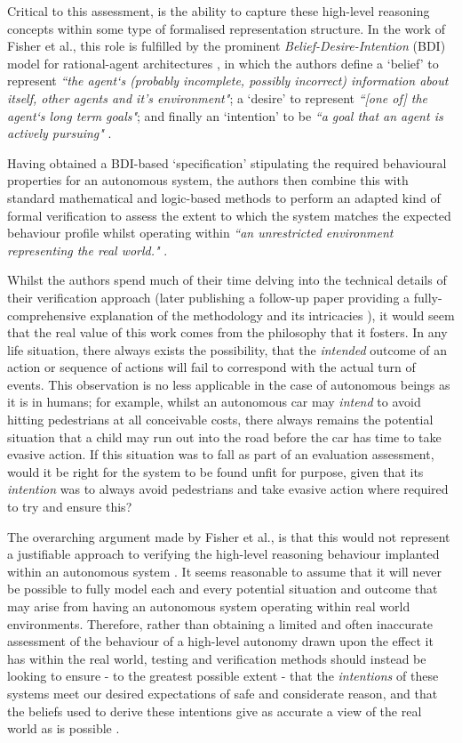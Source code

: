 \documentclass[conference]{IEEEtran}
\begin{document}
Critical to this assessment, is the ability to capture these high-level reasoning concepts within some type of formalised representation structure. In the work of Fisher et al., this role is fulfilled by the prominent \textit{Belief-Desire-Intention} (BDI) model for rational-agent architectures \cite{bdi}, in which the authors define a `belief' to represent \textit{``the agent`s (probably incomplete, possibly incorrect) information about itself, other agents and it's environment"}; a `desire' to represent \textit{``[one of] the agent`s long term goals"}; and finally an `intention' to be \textit{``a goal that an agent is actively pursuing"} \cite{fisher-1}. 

Having obtained a BDI-based `specification' stipulating the required behavioural properties for an autonomous system, the authors then combine this with standard mathematical and logic-based methods to perform an adapted kind of formal verification to assess the extent to which the system matches the expected behaviour profile whilst operating within \textit{``an unrestricted environment representing the real world."} \cite{fisher-1}.

Whilst the authors spend much of their time delving into the technical details of their verification approach (later publishing a follow-up paper providing a fully-comprehensive explanation of the methodology and its intricacies \cite{fisher-2}), it would seem that the real value of this work comes from the philosophy that it fosters. In any life situation, there always exists the possibility, that the \textit{intended} outcome of an action or sequence of actions will fail to correspond with the actual turn of events. This observation is no less applicable in the case of autonomous beings as it is in humans; for example, whilst an autonomous car may \textit{intend} to avoid hitting pedestrians at all conceivable costs, there always remains the potential situation that a child may run out into the road before the car has time to take evasive action. If this situation was to fall as part of an evaluation assessment, would it be right for the system to be found unfit for purpose, given that its \textit{intention} was to always avoid pedestrians and take evasive action where required to try and ensure this? 

The overarching argument made by Fisher et al., is that this would not represent a justifiable approach to verifying the high-level reasoning behaviour implanted within an autonomous system \cite{fisher-1}. It seems reasonable to assume that it will never be possible to fully model each and every potential situation and outcome that may arise from having an autonomous system operating within real world environments. Therefore, rather than obtaining a limited and often inaccurate assessment of the behaviour of a high-level autonomy drawn upon the effect it has within the real world, testing and verification methods should instead be looking to ensure - to the greatest possible extent - that the \textit{intentions} of these systems meet our desired expectations of safe and considerate reason, and that the beliefs used to derive these intentions give as accurate a view of the real world as is possible \cite{fisher-2}. 
\end{document}
